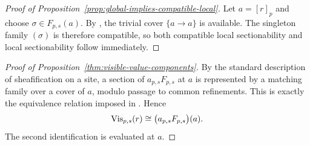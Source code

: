 \begin{proof}[Proof of Proposition~\ref{prop:global-implies-compatible-local}]
Let $a=[r]_p$ and choose $\sigma\in F_{p,s}(a)$. By , the trivial cover $\{a\to a\}$ is available. The singleton family $(\sigma)$ is therefore compatible, so both compatible local sectionability and local sectionability follow immediately.
\end{proof}

\begin{proof}[Proof of Proposition~\ref{thm:visible-value-components}]
By the standard description of sheafification on a site, a section of $a_{p,s}F_{p,s}$ at $a$ is represented by a matching family over a cover of $a$, modulo passage to common refinements. This is exactly the equivalence relation imposed in . Hence
\[
\mathrm{Vis}_{p,s}(r)\cong \bigl(a_{p,s}F_{p,s}\bigr)(a).
\]
The second identification is  evaluated at $a$.
\end{proof}

\endinput
